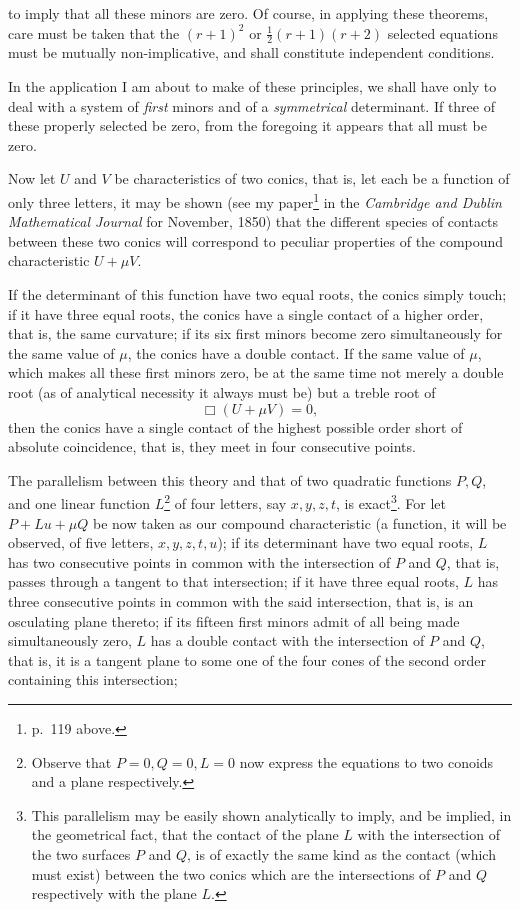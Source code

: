 \documentclass[11pt]{article}
\newcommand{\sourcepage}[1]{\marginpar{\scriptsize p.~#1}}
\begin{document}
\sourcepage{148}
to imply that all these minors are zero. Of course, in applying these theorems, care must be taken that the $(r+1)^2$ or $\frac12(r+1)(r+2)$ selected equations must be mutually non-implicative, and shall constitute independent conditions.

In the application I am about to make of these principles, we shall have only to deal with a system of \emph{first} minors and of a \emph{symmetrical} determinant. If three of these properly selected be zero, from the foregoing it appears that all must be zero.

Now let $U$ and $V$ be characteristics of two conics, that is, let each be a function of only three letters, it may be shown (see my paper\footnote{p.~119 above.} in the \emph{Cambridge and Dublin Mathematical Journal} for November, 1850) that the different species of contacts between these two conics will correspond to peculiar properties of the compound characteristic $U+\mu V$.

If the determinant of this function have two equal roots, the conics simply touch; if it have three equal roots, the conics have a single contact of a higher order, that is, the same curvature; if its six first minors become zero simultaneously for the same value of $\mu$, the conics have a double contact. If the same value of $\mu$, which makes all these first minors zero, be at the same time not merely a double root (as of analytical necessity it always must be) but a treble root of
\[
\Box(U+\mu V)=0,
\]
then the conics have a single contact of the highest possible order short of absolute coincidence, that is, they meet in four consecutive points.

The parallelism between this theory and that of two quadratic functions $P,Q$, and one linear function $L$\footnote{Observe that $P=0,Q=0,L=0$ now express the equations to two conoids and a plane respectively.} of four letters, say $x,y,z,t$, is exact\footnote{This parallelism may be easily shown analytically to imply, and be implied, in the geometrical fact, that the contact of the plane $L$ with the intersection of the two surfaces $P$ and $Q$, is of exactly the same kind as the contact (which must exist) between the two conics which are the intersections of $P$ and $Q$ respectively with the plane $L$.}. For let $P+Lu+\mu Q$ be now taken as our compound characteristic (a function, it will be observed, of five letters, $x,y,z,t,u$); if its determinant have two equal roots, $L$ has two consecutive points in common with the intersection of $P$ and $Q$, that is, passes through a tangent to that intersection; if it have three equal roots, $L$ has three consecutive points in common with the said intersection, that is, is an osculating plane thereto; if its fifteen first minors admit of all being made simultaneously zero, $L$ has a double contact with the intersection of $P$ and $Q$, that is, it is a tangent plane to some one of the four cones of the second order containing this intersection;
\end{document}
